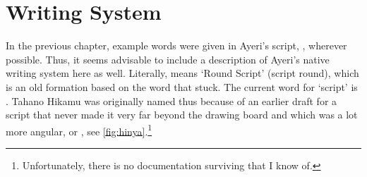 
\chapter{Writing System}

In the previous chapter, example words were given in Ayeri's script, , wherever possible. Thus, it seems advisable to include a 
description of Ayeri's native writing system here as well. Literally, 
 means `Round Script' (script round), which is 
an old formation based on the word  that  stuck. The 
current word for `script' is . Tahano Hikamu was 
originally named thus because of an earlier draft for a script that never made 
it very far beyond the drawing board and which was a lot more angular, or 
, see \autoref{fig:hinya}.\footnote{Unfortunately, there is 
no documentation surviving that I know of.}

